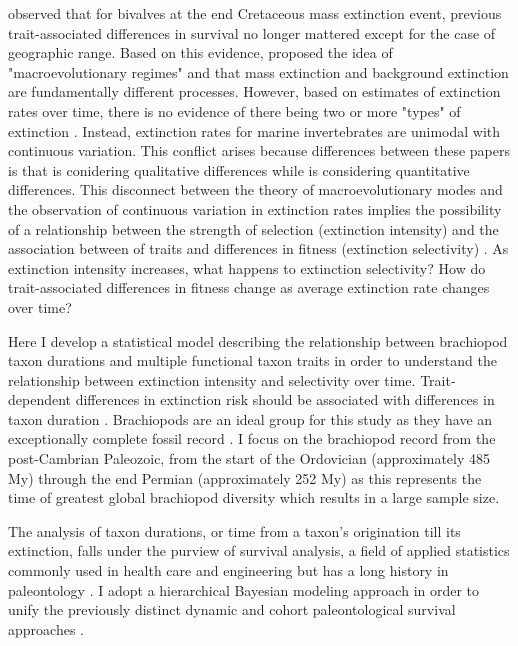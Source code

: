 \documentclass[11pt]{article}
\begin{document}
\citet{Jablonski1986} observed that for bivalves at the end Cretaceous mass extinction event, previous trait-associated differences in survival no longer mattered except for the case of geographic range. Based on this evidence, \citet{Jablonski1986} proposed the idea of "macroevolutionary regimes" and that mass extinction and background extinction are fundamentally different processes. However, based on estimates of extinction rates over time, there is no evidence of there being two or more "types" of extinction \citep{Wang2003}. Instead, extinction rates for marine invertebrates are unimodal with continuous variation. This conflict arises because differences between these papers is that \citet{Jablonski1986} is conidering qualitative differences while \citet{Wang2003} is considering quantitative differences. This disconnect between the theory of macroevolutionary modes and the observation of continuous variation in extinction rates implies the possibility of a relationship between the strength of selection (extinction intensity) and the association between of traits and differences in fitness (extinction selectivity) \citep{Payne2016}. As extinction intensity increases, what happens to extinction selectivity? How do trait-associated differences in fitness change as average extinction rate changes over time?

Here I develop a statistical model describing the relationship between brachiopod taxon durations and multiple functional taxon traits in order to understand the relationship between extinction intensity and selectivity over time. Trait-dependent differences in extinction risk should be associated with differences in taxon duration \citep{Cooper1984,Rabosky2010b}. Brachiopods are an ideal group for this study as they have an exceptionally complete fossil record \citep{Foote1996e,Foote2000a}. I focus on the brachiopod record from the post-Cambrian Paleozoic, from the start of the Ordovician (approximately 485 My) through the end Permian (approximately 252 My) as this represents the time of greatest global brachiopod diversity \citep{Alroy2010} which results in a large sample size.

The analysis of taxon durations, or time from a taxon's origination till its extinction, falls under the purview of survival analysis, a field of applied statistics commonly used in health care and engineering \citep{Klein2003} but has a long history in paleontology \citep{Simpson1944,Simpson1953,VanValen1973,VanValen1979,Smits2015,Crampton2016}. I adopt a hierarchical Bayesian modeling approach \citep{Gelman2007,Gelman2013d} in order to unify the previously distinct dynamic and cohort paleontological survival approaches \citep{VanValen1973,VanValen1979,Raup1978,Raup1975,Foote1988,Baumiller1993,Simpson2006,Crampton2016,Ezard2012b}. 
\end{document}
